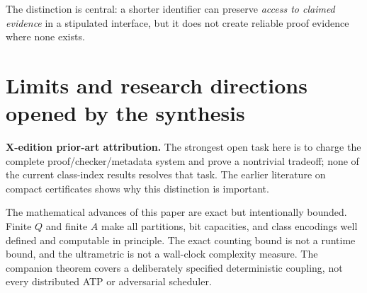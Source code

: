 \documentclass[11pt,letterpaper]{article}
\newcommand{\PriorArtNote}[1]{%
\par\smallskip\noindent\begin{minipage}{\linewidth}\small\color{black!85}%
\textbf{X-edition prior-art attribution.} #1\end{minipage}\par\smallskip}
\begin{document}
The distinction is central: a shorter identifier can preserve \emph{access to claimed evidence} in a stipulated interface, but it does not create reliable proof evidence where none exists.

\section{Limits and research directions opened by the synthesis}
\PriorArtNote{The strongest open task here is to charge the complete proof/checker/metadata system and prove a nontrivial tradeoff; none of the current class-index results resolves that task. The earlier literature on compact certificates \cite{besson} shows why this distinction is important.}
The mathematical advances of this paper are exact but intentionally bounded. Finite $Q$ and finite $A$ make all partitions, bit capacities, and class encodings well defined and computable in principle. The exact counting bound is not a runtime bound, and the ultrametric is not a wall-clock complexity measure. The companion theorem covers a deliberately specified deterministic coupling, not every distributed ATP or adversarial scheduler.
\end{document}
